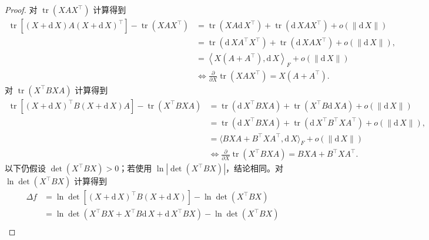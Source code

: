 \begin{proof}
    对 $\operatorname{tr}(XAX^\top)$ 计算得到
    \[
        \begin{aligned}
            \operatorname{tr}\left[\left(X + \mathrm{d}\,X\right) A \left(X + \mathrm{d}\,X\right)^\top\right] - \operatorname{tr}(XAX^\top)
            &= \operatorname{tr}\left(X A \mathrm{d}\,X^\top\right) + \operatorname{tr}\left(\mathrm{d}\,X A X^\top\right) + o\left(\|\mathrm{d}\,X\|\right) \\
            &= \operatorname{tr} \left(\mathrm{d}\,X A^\top X^\top\right) + \operatorname{tr}\left(\mathrm{d}\,X A X^\top\right) + o\left(\|\mathrm{d}\,X\|\right), \\
            &= \left\langle X\left(A + A^\top\right), \mathrm{d}\,X \right\rangle_F + o\left(\|\mathrm{d}\,X\|\right) \\
            &\iff \frac{\partial}{\partial X} \operatorname{tr}\left(XAX^\top\right) = X(A + A^\top).
        \end{aligned}
    \]
    对 $\operatorname{tr}\left(X^\top BXA\right)$ 计算得到
    \[
        \begin{aligned}
            \operatorname{tr}\left[\left(X + \mathrm{d}\,X\right)^\top B \left(X + \mathrm{d}\,X\right) A\right] - \operatorname{tr}\left(X^\top BXA\right)
            &= \operatorname{tr}\left(\mathrm{d}\,X^\top B X A\right) + \operatorname{tr}\left(X^\top B \mathrm{d}\,X A\right) + o(\|\mathrm{d}\,X\|) \\
            &= \operatorname{tr} \left(\mathrm{d}\,X^\top B X A\right) + \operatorname{tr}\left(\mathrm{d}\,X^\top B^\top X A^\top\right) + o(\|\mathrm{d}\,X\|), \\
            &= \langle BXA + B^\top XA^\top, \mathrm{d}\,X \rangle_F + o(\|\mathrm{d}\,X\|) \\
            &\iff \frac{\partial}{\partial X} \operatorname{tr}\left(X^\top BXA\right) = BXA + B^\top XA^\top.
        \end{aligned}
    \]
    以下仍假设 $\det(X^\top BX)>0$；若使用 $\ln|\det(X^\top BX)|$，结论相同。对 $\ln \det\left(X^\top BX\right)$ 计算得到
    \[
        \begin{aligned}
            \Delta f &= \ln \det\left[\left(X + \mathrm{d}\,X\right)^\top B \left(X + \mathrm{d}\,X\right)\right] - \ln \det\left(X^\top BX\right) \\
            &= \ln \det\left(X^\top BX + X^\top B \mathrm{d}\,X + \mathrm{d}\,X^\top B X\right) - \ln \det\left(X^\top BX\right) \\

\end{aligned}\]
\end{proof}
